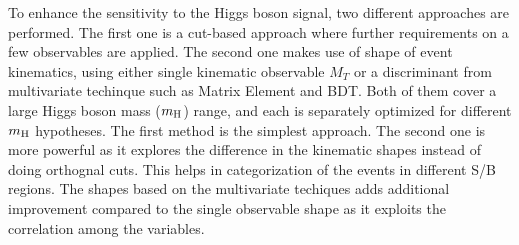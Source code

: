 To enhance the sensitivity to the Higgs boson signal, two different approaches 
are performed. The first one is a cut-based approach where further requirements 
on a few observables are applied. The second one makes use of shape of 
event kinematics, using either single kinematic observable $M_T$ or 
a discriminant from multivariate techinque such as Matrix Element and BDT. 
Both of them cover a large Higgs boson mass ($m_{\rm{H}}$) range, 
and each is separately optimized for different
$m_{\rm{H}}$ hypotheses. The first method is the simplest approach. 
The second one is more powerful as it explores the difference in the kinematic 
shapes instead of doing orthognal cuts. This helps in categorization of the 
events in different S/B regions. 
The shapes based on the multivariate techiques adds additional improvement 
compared to the single observable shape as it exploits the 
correlation among the variables. 
		







